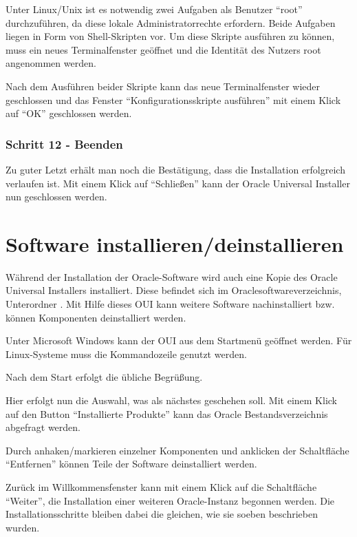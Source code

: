           Unter Linux/Unix ist es notwendig zwei Aufgaben als Benutzer \enquote{root} durchzuf\"uhren, da diese lokale Administratorrechte erfordern. Beide Aufgaben liegen in Form von Shell-Skripten vor. Um diese Skripte ausf\"uhren zu k\"onnen, muss ein neues Terminalfenster ge\"offnet und die Identit\"at des Nutzers root angenommen werden.

          Nach dem Ausf\"uhren beider Skripte kann das neue Terminalfenster wieder geschlossen und das Fenster \enquote{Konfigurationsskripte ausf\"uhren} mit einem Klick auf \enquote{OK} geschlossen werden.


\clearpage
        \subsubsection{Schritt 12 - Beenden}
          Zu guter Letzt erh\"alt man noch die Best\"atigung, dass die Installation erfolgreich verlaufen ist. Mit einem Klick auf \enquote{Schlie\ss{}en} kann der Oracle Universal Installer nun geschlossen werden.
    \section{Software installieren/deinstallieren}
      W\"ahrend der Installation der Oracle-Software wird auch eine Kopie des Oracle Universal Installers installiert. Diese befindet sich im Oraclesoftwareverzeichnis, Unterordner . Mit Hilfe dieses OUI kann weitere Software nachinstalliert bzw. k\"onnen Komponenten deinstalliert werden.

      Unter Microsoft Windows kann der OUI aus dem Startmen\"u ge\"offnet werden. F\"ur Linux-Systeme muss die Kommandozeile genutzt werden.


      Nach dem Start erfolgt die \"ubliche Begr\"u\ss{}ung.

      Hier erfolgt nun die Auswahl, was als n\"achstes geschehen soll. Mit einem Klick auf den Button \enquote{Installierte Produkte} kann das Oracle Bestandsverzeichnis abgefragt werden.

      Durch anhaken/markieren einzelner Komponenten und anklicken der Schaltfl\"ache \enquote{Entfernen} k\"onnen Teile der Software deinstalliert werden.

      Zur\"uck im Willkommensfenster kann mit einem Klick auf die Schaltfl\"ache \enquote{Weiter}, die Installation einer weiteren Oracle-Instanz begonnen werden. Die Installationsschritte bleiben dabei die gleichen, wie sie soeben beschrieben wurden.
\clearpage
